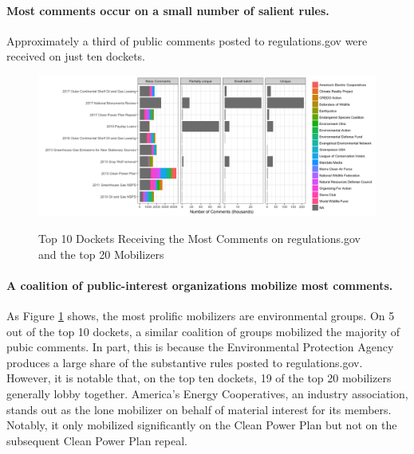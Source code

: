 \paragraph{Most comments occur on a small number of salient rules.} Approximately a third of public comments posted to regulations.gov were received on just ten dockets.


\begin{figure}
    \centering
        \caption{Top 10 Dockets Receiving the Most Comments on regulations.gov and the top 20 Mobilizers}
    \includegraphics[width = 6in]{Figs/topdockets.png}
    \label{fig:topdockets}
\end{figure}


\paragraph{A coalition of public-interest organizations mobilize most comments.} As Figure \ref{fig:topdockets} %
shows, the most prolific mobilizers are environmental groups. On 5 out of the top 10 dockets, a similar coalition of groups mobilized the majority of pubic comments. In part, this is because the Environmental Protection Agency produces a large share of the substantive rules posted to regulations.gov. However, it is notable that, on the top ten dockets, 19 of the top 20 mobilizers generally lobby together. America's Energy Cooperatives, an industry association, stands out as the lone mobilizer on behalf of material interest for its members. Notably, it only mobilized significantly on the Clean Power Plan but not on the subsequent Clean Power Plan repeal. 